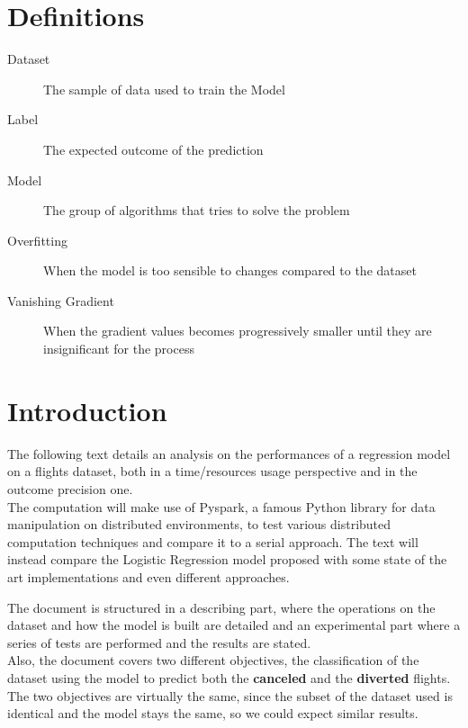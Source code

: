 \documentclass[
	letterpaper, %
	10pt, %
]{class}
\begin{document}
\section{Definitions}\label{definitions} %

\begin{description}
    \item[Dataset] The sample of data used to train the Model
    \item[Label] The expected outcome of the prediction
    \item[Model] The group of algorithms that tries to solve the problem
    \item[Overfitting] When the model is too sensible to changes compared to the dataset
    \item[Vanishing Gradient] When the gradient values becomes progressively smaller until they are insignificant for the process
\end{description}


\section{Introduction}

The following text details an analysis on the performances of a regression model on a flights dataset, both in a time/resources usage perspective and in the outcome precision one.\\
The computation will make use of Pyspark, a famous Python library for data manipulation on distributed environments, to test various distributed computation techniques and compare it to a serial approach.
The text will instead compare the Logistic Regression model proposed with some state of the art implementations and even different approaches.

The document is structured in a describing part, where the operations on the dataset and how the model is built are detailed and an experimental part where a series of tests are performed and the results are stated.\\

Also, the document covers two different objectives, the classification of the dataset using the model to predict both the \textbf{canceled} and the \textbf{diverted} flights.\\
The two objectives are virtually the same, since the subset of the dataset used is identical and the model stays the same, so we could expect similar results.\\
\end{document}
